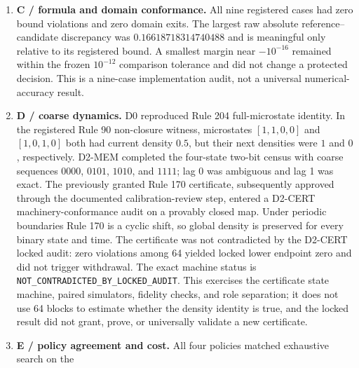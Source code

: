 \begin{enumerate}
complete-support blocks, with class minimum lower bound zero and no false
\classbad{} decision. B1 returned \classbad{} in all 64 complete radius-two blocks; every
registered class minimum lower bound was \(0.5\), above the frozen threshold \(0.2\). B1 is a
constructed distinguishable out-of-class family: its outer-XOR construction makes every radius-one
candidate disagree on exactly half of the complete 32-row support. B0's truth candidate has exact
loss zero. Because the registered classes in these gates are singletons, class minima equal exact
candidate losses; neither a non-singleton aggregation nor the general repeated-look radius was
exercised. The 64 role-derived repetitions are gate/ledger conformance checks, not evidence that
APHFS detects arbitrary model misspecification.
\item \textbf{C / formula and domain conformance.} All nine registered cases had zero bound
violations and zero domain exits. The largest raw absolute reference--candidate discrepancy was
\(0.16618718314740488\) and is meaningful only relative to its registered bound. A smallest
margin near \(-10^{-16}\) remained within the frozen \(10^{-12}\) comparison tolerance and did
not change a protected decision. This is a nine-case implementation audit, not a universal
numerical-accuracy result.
\item \textbf{D / coarse dynamics.} D0 reproduced Rule 204 full-microstate identity. In the
registered Rule 90 non-closure witness, microstates \([1,1,0,0]\) and \([1,0,1,0]\) both had
current density \(0.5\), but their next densities were \(1\) and \(0\), respectively. D2-MEM
completed the four-state two-bit census with coarse sequences \(0000\), \(0101\), \(1010\), and
\(1111\); lag 0 was ambiguous and lag 1 was exact. The previously granted Rule 170 certificate,
subsequently approved through the documented calibration-review step, entered a D2-CERT
machinery-conformance audit on a provably closed map. Under periodic boundaries Rule 170 is a
cyclic shift, so global density is preserved for every binary state and time. The certificate was
not contradicted by the D2-CERT locked audit:
zero violations among 64 yielded locked lower endpoint zero and did not trigger withdrawal. The
exact machine status is \texttt{NOT\_CONTRADICTED\_BY\_LOCKED\_AUDIT}. This exercises the
certificate state machine, paired simulators, fidelity checks, and role separation; it does not use
64 blocks to estimate whether the density identity is true, and the locked result did not grant,
prove, or universally validate a new certificate.
\item \textbf{E / policy agreement and cost.} All four policies matched exhaustive search on the

\end{enumerate}
